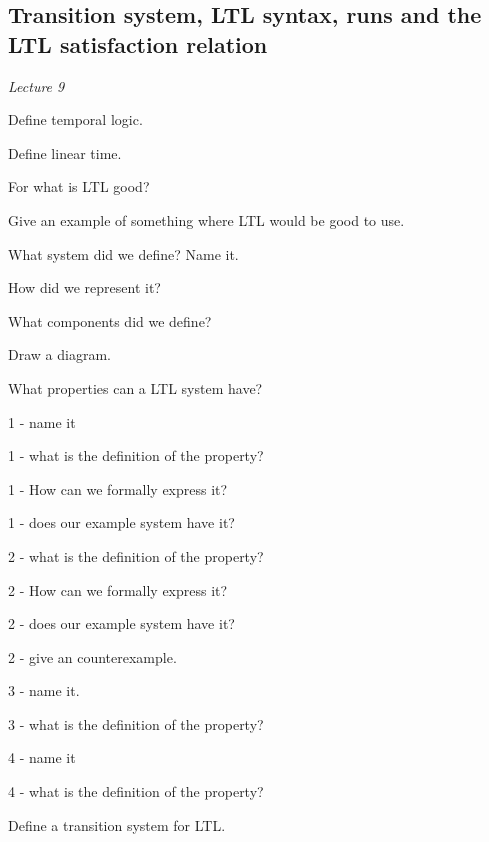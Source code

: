 \documentclass[fleqn]{article}
\begin{document}
\subsection{Transition system, LTL syntax, runs and the LTL satisfaction relation}
\textit{Lecture 9}
\begin{enumerate}
    {\color{red}\item Define temporal logic.}
    {\color{red}\item Define linear time.}
    {\color{red}\item For what is LTL good?}
    {\color{red}\item Give an example of something where LTL would be good to use.}
    {\color{red}\item What system did we define? Name it.}
    \begin{itemize}
        {\color{red}\item How did we represent it? }
        {\color{red}\item What components did we define?}
        {\color{red}\item Draw a diagram.}
    \end{itemize}
    \item What properties can a LTL system have?
    \begin{itemize}
        {\color{red}\item 1 - name it}
        \item 1 - what is the definition of the property?
        {\color{blue}\item 1 - How can we formally express it?}
        \item 1 - does our example system have it? 
        {\color{red}\item 2 - what is the definition of the property?}
        {\color{green}\item 2 - How can we formally express it?}
        {\color{red}\item 2 - does our example system have it?}
        {\color{red}\item 2 - give an counterexample.}
        {\color{red}\item 3 - name it.}
        {\color{red}\item 3 - what is the definition of the property?}
        {\color{red}\item 4 - name it }
        {\color{red}\item 4 - what is the definition of the property?}
    \end{itemize}
    {\color{red}\item Define a transition system for LTL.}

\end{enumerate}
\end{document}
